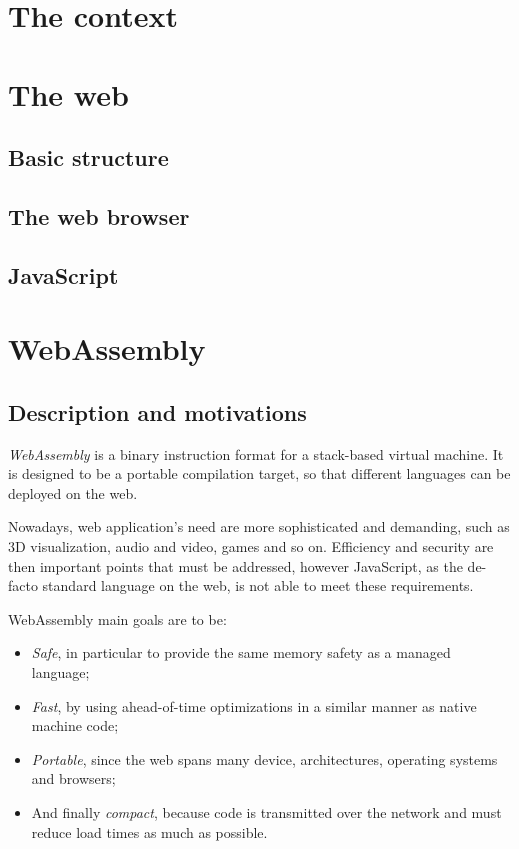 \section{The context}

\section{The web}
\subsection{Basic structure}
\subsection{The web browser}
\subsection{JavaScript}

\section{WebAssembly}
\subsection{Description and motivations}

\textit{WebAssembly} \cite{wasm-website} is a binary instruction format for a stack-based virtual machine.
It is designed to be a portable compilation target, so that different languages can be deployed on the web.

Nowadays, web application's need are more sophisticated and demanding, such as 3D visualization, audio and video,
games and so on. Efficiency and security are then important points that must be addressed, however JavaScript,
as the de-facto standard language on the web, is not able to meet these requirements.

WebAssembly main goals are \cite{bringing-the-web-up-to-speed-2017} to be:
\begin{itemize}
  \item \textit{Safe}, in particular to provide the same memory safety as a managed language;
  \item \textit{Fast}, by using ahead-of-time optimizations in a similar manner as native machine code;
  \item \textit{Portable}, since the web spans many device, architectures, operating systems and browsers;
  \item And finally \textit{compact}, because code is transmitted over the network and must reduce load times as much as possible.
\end{itemize}

